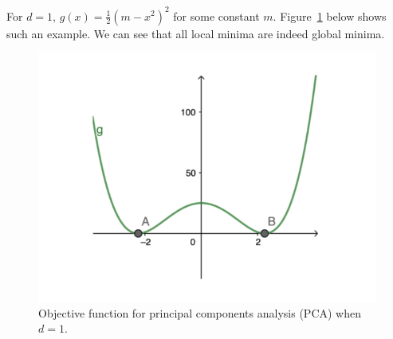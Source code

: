 \begin{remark}
For $d = 1$, $g(x) = \frac{1}{2}(m - x^2)^2$ for some constant $m$. Figure~\ref{lec10:fig:pca_objective} below shows such an example. We can see that all local minima are indeed global minima.
\end{remark}

\begin{figure}[ht!]
    \centering
    \includegraphics[scale = 0.4]{figures/pca.png}
    \caption{Objective function for principal components analysis (PCA) when $d = 1$.}
    \label{lec10:fig:pca_objective}
\end{figure}

